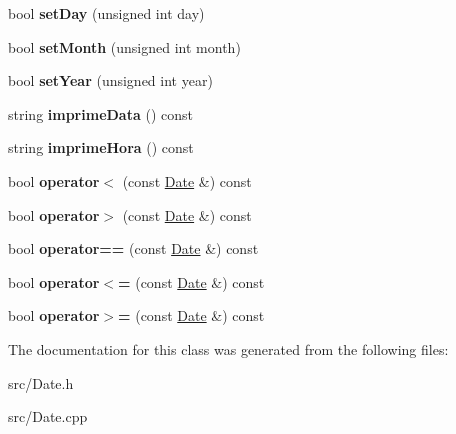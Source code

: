 \begin{DoxyCompactItemize}
\item 
\hypertarget{class_date_aff23cb89959285d5743471cfb8de79be}{bool {\bfseries set\+Day} (unsigned int day)}\label{class_date_aff23cb89959285d5743471cfb8de79be}

\item 
\hypertarget{class_date_a317a64663663c32417496549da4b52ef}{bool {\bfseries set\+Month} (unsigned int month)}\label{class_date_a317a64663663c32417496549da4b52ef}

\item 
\hypertarget{class_date_aae265e5db481eaae2859cbfb2b2d4b1f}{bool {\bfseries set\+Year} (unsigned int year)}\label{class_date_aae265e5db481eaae2859cbfb2b2d4b1f}

\item 
\hypertarget{class_date_a5b5824086305fb1da07e18b78646f755}{string {\bfseries imprime\+Data} () const }\label{class_date_a5b5824086305fb1da07e18b78646f755}

\item 
\hypertarget{class_date_a95be256ae75e67109d5352728c4d9028}{string {\bfseries imprime\+Hora} () const }\label{class_date_a95be256ae75e67109d5352728c4d9028}

\item 
\hypertarget{class_date_a691bafd5bba9540f3c540f7327a758c2}{bool {\bfseries operator$<$} (const \hyperlink{class_date}{Date} \&) const }\label{class_date_a691bafd5bba9540f3c540f7327a758c2}

\item 
\hypertarget{class_date_a0bd06d545842c948cdca8ccc60d7d68d}{bool {\bfseries operator$>$} (const \hyperlink{class_date}{Date} \&) const }\label{class_date_a0bd06d545842c948cdca8ccc60d7d68d}

\item 
\hypertarget{class_date_ad54d8e4b8f2ad6df8eda3b8615c3c0b2}{bool {\bfseries operator==} (const \hyperlink{class_date}{Date} \&) const }\label{class_date_ad54d8e4b8f2ad6df8eda3b8615c3c0b2}

\item 
\hypertarget{class_date_a6632fd56fe1c549ef0a257c85fd8eb3e}{bool {\bfseries operator$<$=} (const \hyperlink{class_date}{Date} \&) const }\label{class_date_a6632fd56fe1c549ef0a257c85fd8eb3e}

\item 
\hypertarget{class_date_ae4802fa52cf81f1a259b4a3b88bffc0d}{bool {\bfseries operator$>$=} (const \hyperlink{class_date}{Date} \&) const }\label{class_date_ae4802fa52cf81f1a259b4a3b88bffc0d}

\end{DoxyCompactItemize}


The documentation for this class was generated from the following files\+:\begin{DoxyCompactItemize}
\item 
src/Date.\+h\item 
src/Date.\+cpp\end{DoxyCompactItemize}
